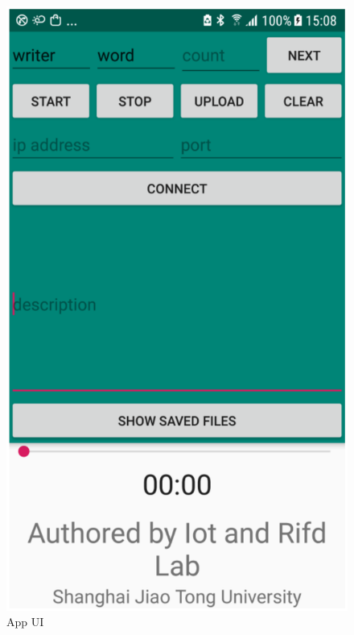 \begin{figure}
  \centering
  \begin{minipage}[t]{0.32\textwidth}
    \centering
    \includegraphics[width=\textwidth]{figure/app-ui.pdf}
      {App UI}
        \label{fig:app-ui}
  \end{minipage}
  \centering
  \begin{minipage}[t]{0.32\textwidth}
    \centering

\end{minipage}
\end{figure}
